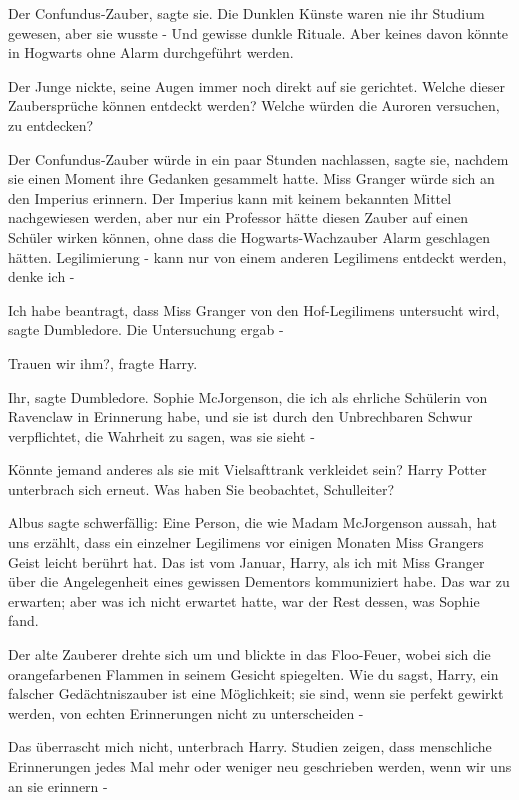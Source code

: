 \glqq Der Confundus-Zauber\grqq{}, sagte sie. Die Dunklen Künste waren nie ihr
Studium gewesen, aber sie wusste - \glqq Und gewisse dunkle Rituale. Aber keines
davon könnte in Hogwarts ohne Alarm durchgeführt werden.\grqq{}

Der Junge nickte, seine Augen immer noch direkt auf sie gerichtet. \glqq Welche
dieser Zaubersprüche können entdeckt werden? Welche würden die Auroren
versuchen, zu entdecken?\grqq{}

\glqq Der Confundus-Zauber würde in ein paar Stunden nachlassen\grqq{}, sagte
sie, nachdem sie einen Moment ihre Gedanken gesammelt hatte. \glqq Miss Granger
würde sich an den Imperius erinnern. Der Imperius kann mit keinem bekannten
Mittel nachgewiesen werden, aber nur ein Professor hätte diesen Zauber auf einen
Schüler wirken können, ohne dass die Hogwarts-Wachzauber Alarm geschlagen
hätten. Legilimierung - kann nur von einem anderen Legilimens entdeckt werden,
denke ich -\grqq{}

\glqq Ich habe beantragt, dass Miss Granger von den Hof-Legilimens untersucht
wird\grqq{}, sagte Dumbledore. \glqq Die Untersuchung ergab -\grqq{}

\glqq Trauen wir ihm?\grqq{}, fragte Harry.

\glqq Ihr\grqq{}, sagte Dumbledore. \glqq Sophie McJorgenson, die ich als
ehrliche Schülerin von Ravenclaw in Erinnerung habe, und sie ist durch den
Unbrechbaren Schwur verpflichtet, die Wahrheit zu sagen, was sie sieht -\grqq{}

\glqq Könnte jemand anderes als sie mit Vielsafttrank verkleidet sein?\grqq{}
Harry Potter unterbrach sich erneut. \glqq Was haben Sie beobachtet,
Schulleiter?\grqq{}

Albus sagte schwerfällig: \glqq Eine Person, die wie Madam McJorgenson aussah,
hat uns erzählt, dass ein einzelner Legilimens vor einigen Monaten Miss Grangers
Geist leicht berührt hat. Das ist vom Januar, Harry, als ich mit Miss Granger
über die Angelegenheit eines gewissen Dementors kommuniziert habe. Das war zu
erwarten; aber was ich nicht erwartet hatte, war der Rest dessen, was Sophie
fand.\grqq{}

Der alte Zauberer drehte sich um und blickte in das Floo-Feuer, wobei sich die
orangefarbenen Flammen in seinem Gesicht spiegelten. \glqq Wie du sagst, Harry,
ein falscher Gedächtniszauber ist eine Möglichkeit; sie sind, wenn sie perfekt
gewirkt werden, von echten Erinnerungen nicht zu unterscheiden -\grqq{}

\glqq Das überrascht mich nicht\grqq{}, unterbrach Harry. \glqq Studien zeigen,
dass menschliche Erinnerungen jedes Mal mehr oder weniger neu geschrieben
werden, wenn wir uns an sie erinnern -\grqq{}


